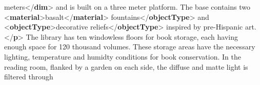 \begin{shaded}
\hspace*{1em}\hspace*{1em}\hspace*{1em}\hspace*{1em}\hspace*{1em}\hspace*{1em}\hspace*{1em}\hspace*{1em} meters{</\textbf{dim}>} and is built on a three meter platform. The base contains two {<\textbf{material}>}basalt{</\textbf{material}>}\mbox{}\newline 
\hspace*{1em}\hspace*{1em}\hspace*{1em}fountains{</\textbf{objectType}>} and {<\textbf{objectType}>}decorative reliefs{</\textbf{objectType}>} inspired by\mbox{}\newline 
\hspace*{1em}\hspace*{1em}\hspace*{1em}\hspace*{1em}\hspace*{1em}\hspace*{1em} pre-Hispanic art.{</\textbf{p}>}\mbox{}\newline 
\hspace*{1em}\hspace*{1em}The library has ten windowless floors for book storage, each having enough space for 120 thousand volumes.\mbox{}\newline 
\hspace*{1em}\hspace*{1em}\hspace*{1em}\hspace*{1em}\hspace*{1em}\hspace*{1em} These storage areas have the necessary lighting, temperature and humidty conditions for book conservation.\mbox{}\newline 
\hspace*{1em}\hspace*{1em}\hspace*{1em}\hspace*{1em}\hspace*{1em}\hspace*{1em} In the reading room, flanked by a garden on each side, the diffuse and matte light is filtered through\mbox{}\newline 

\end{shaded}
